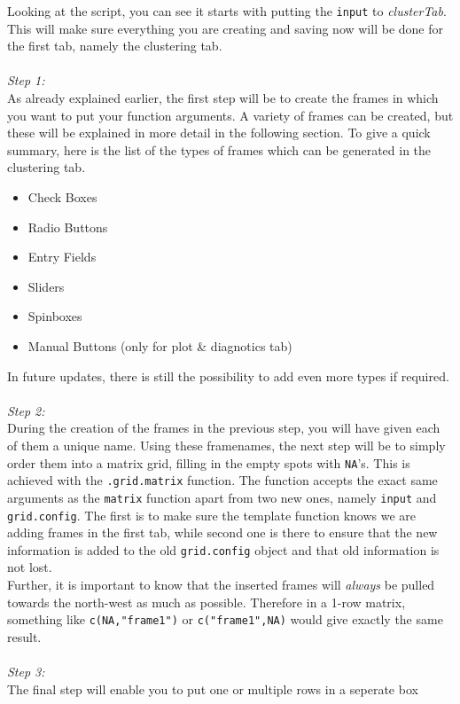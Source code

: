 \documentclass[a4paper]{article}\usepackage[]{graphicx}\usepackage[]{color}
\begin{document}
\noindent Looking at the script, you can see it starts with putting the
\verb|input| to {\it clusterTab}. This will make sure everything you are
creating and saving now will be done for the first tab, namely the clustering
tab.
\\
\\
{\it Step 1:}\\
As already explained earlier, the first step will be to create the frames in
which you want to put your function arguments. A variety of frames can be
created, but these will be explained in more detail in the following section. To
give a quick summary, here is the list of the types of frames which can be
generated in the clustering tab.
\begin{itemize}
  \item Check Boxes
  \item Radio Buttons
  \item Entry Fields
  \item Sliders
  \item Spinboxes
  \item Manual Buttons (only for plot \& diagnotics tab)
\end{itemize}
\noindent In future updates, there is still the possibility to add even more
types if required.
\\ \\
{\it Step 2:}\\
During the creation of the frames in the previous step, you will have given each
of them a unique name. Using these framenames, the next step will be to simply
order them into a matrix grid, filling in the empty spots with \verb|NA|'s.
This is achieved with the \verb|.grid.matrix| function. The function accepts
the exact same arguments as the \verb|matrix| function apart from two new ones,
namely \verb|input| and \verb|grid.config|. The first is to make sure the
template function knows we are adding frames in the first tab, while second one
is there to ensure that the new information is added to the old
\verb|grid.config| object and that old information is not lost.\\
Further, it is important to know that the inserted frames will {\it always} be
pulled towards the north-west as much as possible. Therefore in a 1-row
matrix, something like \verb|c(NA,"frame1")| or \verb|c("frame1",NA)| would give
exactly the same result.
\\ \\
{\it Step 3:}\\
The final step will enable you to put one or multiple rows in a seperate box
\end{document}
